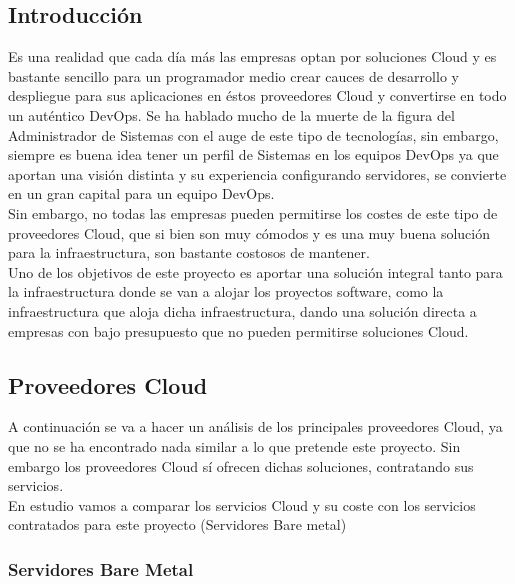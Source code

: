 	\subsection{Introducción}
		\begin{paragraph}
			Es una realidad que cada día más las empresas optan por soluciones Cloud y es bastante sencillo para un programador medio crear cauces de desarrollo y despliegue para sus aplicaciones en éstos proveedores Cloud y convertirse en todo un auténtico DevOps. Se ha hablado mucho de la muerte de la figura del Administrador de Sistemas con el auge de este tipo de tecnologías, sin embargo, siempre es buena idea tener un perfil de Sistemas en los equipos DevOps ya que aportan una visión distinta y su experiencia configurando servidores, se convierte en un gran capital para un equipo DevOps. \\ 
			Sin embargo, no todas las empresas pueden permitirse los costes de este tipo de proveedores Cloud, que si bien son muy cómodos y es una muy buena solución para la infraestructura, son bastante costosos de mantener. \\
			Uno de los objetivos de este proyecto es aportar una solución integral tanto para la infraestructura donde se van a alojar los proyectos software, como la infraestructura que aloja dicha infraestructura, dando una solución directa a empresas con bajo presupuesto que no pueden permitirse soluciones Cloud. \\
		\end{paragraph}
	
	\subsection{Proveedores Cloud}
		\begin{paragraph}
			A continuación se va a hacer un análisis de los principales proveedores Cloud, ya que no se ha encontrado nada similar a lo que pretende este proyecto. Sin embargo los proveedores Cloud sí ofrecen dichas soluciones, contratando sus servicios. \\
			En estudio vamos a comparar los servicios Cloud y su coste con los servicios contratados para este proyecto (Servidores Bare metal) \\
		\end{paragraph}
	
		\subsubsection{Servidores Bare Metal}
			\label{servidores_bare_metal}

